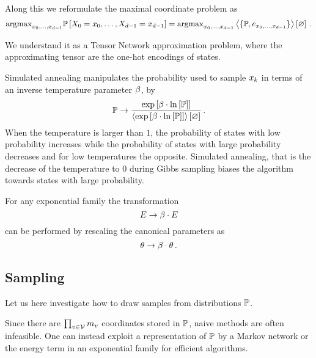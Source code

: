 Along this we reformulate the maximal coordinate problem as
\begin{align}
	\mathrm{argmax}_{x_{0},\ldots,x_{d-1}} \mathbb{P}\left[X_{0}=x_{0},\ldots,X_{d-1}=x_{d-1}\right] 
	= \mathrm{argmax}_{x_{0},\ldots,x_{d-1}} \left\langle \{\mathbb{P}, e_{x_{0},\ldots,x_{d-1}}\}\right\rangle \left[ \varnothing \right]  \, .
\end{align}

We understand it as a Tensor Network approximation problem, where the approximating tensor are the one-hot encodings of states.



\begin{remark}\label{rem:simulatedAnnealing}
	Simulated annealing manipulates the probability used to sample $x_{k}$ in terms of an inverse temperature parameter $\beta$, by
		\[ \mathbb{P} \rightarrow \frac{\mathrm{exp}\left[\beta\cdot\ln \left[ \mathbb{P} \right]\right]}{\left\langle \mathrm{exp}\left[\beta\cdot\ln \left[ \mathbb{P} \right]\right]\right\rangle \left[ \varnothing \right] } \, . \]
	When the temperature is larger than $1$, the probability of states with low probability increases while the probability of states with large probability decreases and for low temperatures the opposite.
	Simulated annealing, that is the decrease of the temperature to $0$ during Gibbs sampling biases the algorithm towards states with large probability.

	For any exponential family the transformation 
		\[ E \rightarrow \beta \cdot E  \]
	can be performed by rescaling the canonical parameters as
		\[ \theta \rightarrow \beta \cdot \theta \, . \]
\end{remark}





\subsection{Sampling}

Let us here investigate how to draw samples from distributions $\mathbb{P}$.

Since there are $\prod_{v\in\mathcal{V}}m_{v}$ coordinates stored in $\mathbb{P}$, naive methods are often infeasible.
One can instead exploit a representation of $\mathbb{P}$ by a Markov network or the energy term in an exponential family for efficient algorithms.

